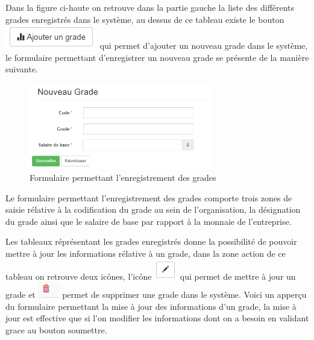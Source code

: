 \documentclass[12pt,a4paper]{report}
\begin{document}
Dans la figure ci-haute on retrouve dans la partie gauche la liste des différents grades enregistrés dans le système, au dessus de ce tableau existe le bouton \includegraphics[scale=1]{pic/AddGrade.png} qui permet d'ajouter un nouveau grade dans le système, le formulaire permettant d'enregistrer un nouveau grade se présente de la manière suivante.

\begin{figure}[h]
\begin{center}
\includegraphics[width=8cm]{pic/NewGrade.png}
\end{center}
\caption{Formulaire permettant l'enregistrement des grades}
\label{Formulaire permettant l'enregistrement des grades}
\end{figure} 

Le formulaire permettant l'enregistrement des grades comporte trois zones de saisie rélative à la codification du grade au sein de l'organisation, la désignation du grade ainsi que le salaire de base par rapport à la monnaie de l'entreprise. 

Les tableaux réprésentant les grades enregistrés donne la possibilité de pouvoir mettre à jour les informations rélative à un grade, dans la zone action de ce tableau on retrouve deux icônes, l'icône \includegraphics[scale=0.7]{pic/EditBlack.png} qui permet de mettre à jour un grade et \includegraphics[scale=0.7]{pic/DeleteWRed.png} permet de supprimer une grade dans le système.
Voici un apperçu du formulaire permettant la mise à jour des informations d'un grade, la mise à jour est effective que si l'on modifier les informations dont on a besoin en validant grace au bouton soumettre. 
\end{document}
